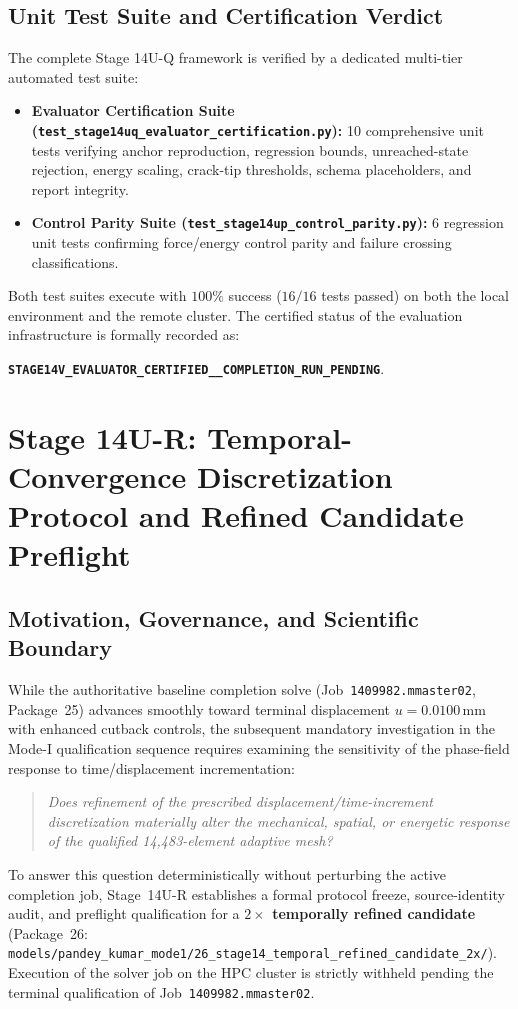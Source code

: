 \subsection{Unit Test Suite and Certification Verdict}
\label{subsec:stage14uq_test_suite}

The complete Stage 14U-Q framework is verified by a dedicated multi-tier automated test suite:
\begin{itemize}
    \item \textbf{Evaluator Certification Suite (\texttt{test\_stage14uq\_evaluator\_certification.py}):} 10 comprehensive unit tests verifying anchor reproduction, regression bounds, unreached-state rejection, energy scaling, crack-tip thresholds, schema placeholders, and report integrity.
    \item \textbf{Control Parity Suite (\texttt{test\_stage14up\_control\_parity.py}):} 6 regression unit tests confirming force/energy control parity and failure crossing classifications.
\end{itemize}
Both test suites execute with $100\%$ success ($16/16$ tests passed) on both the local environment and the remote cluster. The certified status of the evaluation infrastructure is formally recorded as:
\begin{center}
{\footnotesize\textbf{\texttt{STAGE14V\_EVALUATOR\_CERTIFIED\_\_COMPLETION\_RUN\_PENDING}}}.
\end{center}
\section{Stage 14U-R: Temporal-Convergence Discretization Protocol and Refined Candidate Preflight}
\label{sec:stage14ur_temporal_convergence_protocol}

\subsection{Motivation, Governance, and Scientific Boundary}
\label{subsec:stage14ur_motivation}

While the authoritative baseline completion solve (Job~\texttt{1409982.mmaster02}, Package~25) advances smoothly toward terminal displacement $u = 0.0100\,\mathrm{mm}$ with enhanced cutback controls, the subsequent mandatory investigation in the Mode-I qualification sequence requires examining the sensitivity of the phase-field response to time/displacement incrementation:
\begin{quote}
\textit{Does refinement of the prescribed displacement/time-increment discretization materially alter the mechanical, spatial, or energetic response of the qualified 14,483-element adaptive mesh?}
\end{quote}
To answer this question deterministically without perturbing the active completion job, Stage~14U-R establishes a formal protocol freeze, source-identity audit, and preflight qualification for a \textbf{$2\times$ temporally refined candidate} (Package~26: \texttt{models/pandey\_kumar\_mode1/26\_stage14\_temporal\_refined\_candidate\_2x/}). Execution of the solver job on the HPC cluster is strictly withheld pending the terminal qualification of Job~\texttt{1409982.mmaster02}.

